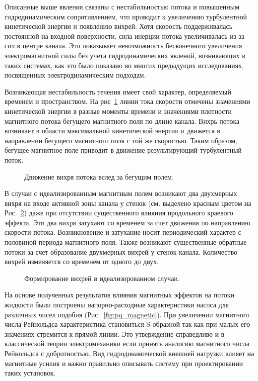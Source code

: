 Описанные выше явления связаны с нестабильностью потока и повышенным гидродинамическим сопротивлением, что приводит к увеличению турбулентной кинетической энергии и появлению вихрей. Хотя скорость поддерживалась постоянной на входной поверхности, сила инерции потока увеличивалась из-за сил в центре канала. Это показывает невозможность бесконечного увеличения электромагнитной силы без учета гидродинамических явлений, возникающих в таких системах, как это было показано во многих предыдущих исследованиях, посвященных электродинамическим подходам.

Возникающая нестабильность течения имеет свой характер, определяемый временем и пространством. На рис~\ref{fig:motion_vortex} линии тока скорости отмечены значениями кинетической энергии в разные моменты времени и значениями плотности магнитного потока бегущего магнитного поля по длине канала. Вихрь потока возникает в области максимальной кинетической энергии и движется в направлении бегущего магнитного поля с той же скоростью. Таким образом, бегущее магнитное поле приводит в движение результирующий турбулентный поток. 

\begin{figure}[h]
	\caption{Движение вихря потока вслед за бегущим полем.}
	\label{fig:motion_vortex}
	
\end{figure}

В случаи с идеализированным магнитным полем возникают два двухмерных вихря на входе активной зоны канала у стенок (см. выделено красным цветом на Рис.~\ref{fig:induced_vortex}) даже при отсутствии существенного влияния продольного краевого эффекта. Эти два вихря затухают со временем за счет движения по направлению скорости потока. Возникновение и затухание носит периодический характер с половиной периода магнитного поля. Также возникают существенные обратные потоки за счет образование двухмерных вихрей у стенок канала. Количество вихрей изменяется со временем от одного до двух. 

\begin{figure}[h]
	\caption{Формирование вихрей в идеализированном случаи.}
	\label{fig:induced_vortex}
\end{figure}

На основе полученных результатов влияния магнитных эффектов на потоки жидкости были построены напорно-расходные характеристики насоса для различных чисел подобия (Рис.~\ref{fig:pq_magnetic}). При увеличении магнитного числа Рейнольдса характеристика становиться S-образной так как при малых его значениях стремится к прямой линии. Это утверждение справедливо и в классической теории электромеханики если принять аналогию магнитного числа Рейнольдса с добротностью. Вид гидродинамической внешней нагрузки влияет на магнитные усилия и важно правильно описывать систему при проектировании таких установок. 



